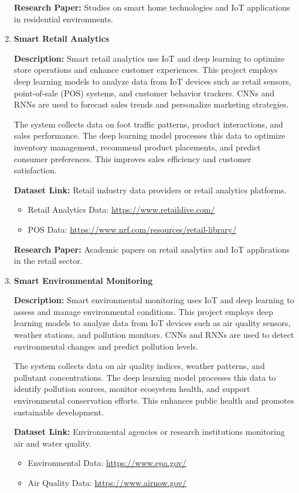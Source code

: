 \documentclass{article}
\begin{document}
\begin{enumerate}[label=\textbf{\arabic*.}, leftmargin=*]
\textbf{Research Paper:} Studies on smart home technologies and IoT applications in residential environments.

\item \textbf{Smart Retail Analytics}

\textbf{Description:}
Smart retail analytics use IoT and deep learning to optimize store operations and enhance customer experiences. This project employs deep learning models to analyze data from IoT devices such as retail sensors, point-of-sale (POS) systems, and customer behavior trackers. CNNs and RNNs are used to forecast sales trends and personalize marketing strategies.

The system collects data on foot traffic patterns, product interactions, and sales performance. The deep learning model processes this data to optimize inventory management, recommend product placements, and predict consumer preferences. This improves sales efficiency and customer satisfaction.

\textbf{Dataset Link:} Retail industry data providers or retail analytics platforms.
\begin{itemize}
    \item Retail Analytics Data: \url{https://www.retaildive.com/}
    \item POS Data: \url{https://www.nrf.com/resources/retail-library/}
\end{itemize}

\textbf{Research Paper:} Academic papers on retail analytics and IoT applications in the retail sector.

\item \textbf{Smart Environmental Monitoring}

\textbf{Description:}
Smart environmental monitoring uses IoT and deep learning to assess and manage environmental conditions. This project employs deep learning models to analyze data from IoT devices such as air quality sensors, weather stations, and pollution monitors. CNNs and RNNs are used to detect environmental changes and predict pollution levels.

The system collects data on air quality indices, weather patterns, and pollutant concentrations. The deep learning model processes this data to identify pollution sources, monitor ecosystem health, and support environmental conservation efforts. This enhances public health and promotes sustainable development.

\textbf{Dataset Link:} Environmental agencies or research institutions monitoring air and water quality.
\begin{itemize}
    \item Environmental Data: \url{https://www.epa.gov/}
    \item Air Quality Data: \url{https://www.airnow.gov/}
\end{itemize}


\end{enumerate}
\end{document}
